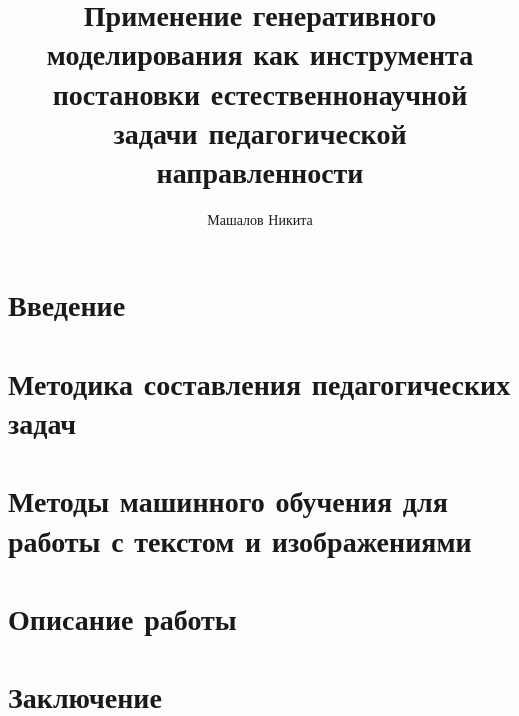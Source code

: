\documentclass{mipt-thesis-bs}
\title{Применение генеративного моделирования как инструмента постановки естественнонаучной задачи педагогической направленности}
\author{Машалов Никита}
\begin{document}
\chapter{Введение}

\chapter{Методика составления педагогических задач}

\chapter{Методы машинного обучения для работы с текстом и изображениями}

\chapter{Описание работы}

\chapter{Заключение}


\printbib
\end{document}
